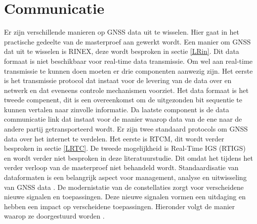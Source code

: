 \section{Communicatie}
\label{LCom}
Er zijn verschillende manieren op GNSS data uit te wisselen. Hier gaat in het practische gedeelte van de masterproef aan gewerkt wordt.  Een manier om GNSS dat uit te wisselen is RINEX, deze wordt besproken in sectie \ref{LRin}. Dit data formaat is niet beschikbaar voor real-time data transmissie. Om wel aan real-time transmissie te kunnen doen moeten er drie componenten aanwezig zijn. Het eerste is  het transmissie protocol dat instaat voor de levering van de data over en netwerk en dat eveneens controle mechanismen voorziet. Het data formaat is het tweede compenent, dit is een overeenkomst om de uitgezonden bit sequentie te kunnen vertalen naar zinvolle informatie. Da laatste component is de data communicatie link dat instaat voor de manier waarop data van de ene naar de andere partij getransporteerd wordt. Er zijn twee standaard protocols om GNSS data over het internet te verdelen. Het eerste is RTCM, dit wordt verder besproken in sectie \ref{LRTC}. De tweede mogelijkheid is Real-Time IGS (RTIGS) \cite{LBibRTCM} en wordt verder niet besproken in deze literatuurstudie. Dit omdat het tijdens het verder verloop van de masterproef niet behandeld wordt. Standaardisatie van dataformaten is een belangrijk aspect voor management, analyse en uitwisseling van GNSS data \cite{LBibRINEX}. De modernistatie van de constellaties zorgt voor verscheidene nieuwe signalen en toepassingen. Deze nieuwe signalen vormen een uitdaging en hebben een impact op verscheidene toepassingen. Hieronder volgt de manier waarop ze doorgestuurd worden \cite{LBibRINEX2}. 

